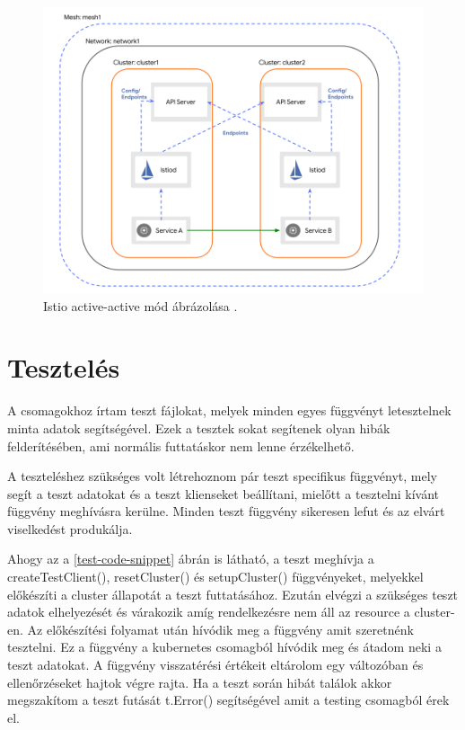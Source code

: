 \begin{figure}[ht]
  \centering
       \includegraphics[width=1.0\textwidth]{figures/kli/active-active.png}
        \caption{Istio active-active mód ábrázolása \cite{istioaa}.}
         \label{active-active}
\end{figure}

\section{Tesztelés}
A csomagokhoz írtam teszt fájlokat, melyek minden egyes függvényt letesztelnek minta adatok segítségével.
Ezek a tesztek sokat segítenek olyan hibák felderítésében, ami normális futtatáskor nem lenne érzékelhető.

A teszteléshez szükséges volt létrehoznom pár teszt specifikus függvényt, mely segít a teszt adatokat és a teszt klienseket beállítani, mielőtt a tesztelni kívánt függvény meghívásra kerülne. Minden teszt függvény sikeresen lefut és az elvárt viselkedést produkálja.

\newpage

Ahogy az a \ref{test-code-snippet} ábrán is látható, a teszt meghívja a createTestClient(), resetCluster() és setupCluster() függvényeket, melyekkel előkészíti a cluster állapotát a teszt futtatásához.
Ezután elvégzi a szükséges teszt adatok elhelyezését és várakozik amíg rendelkezésre nem áll az resource a cluster-en.
Az előkészítési folyamat után hívódik meg a függvény amit szeretnénk tesztelni.
Ez a függvény a kubernetes csomagból hívódik meg és átadom neki a teszt adatokat.
A függvény visszatérési értékeit eltárolom egy változóban és ellenőrzéseket hajtok végre rajta.
Ha a teszt során hibát találok akkor megszakítom a teszt futását t.Error() segítségével amit a testing csomagból érek el.

